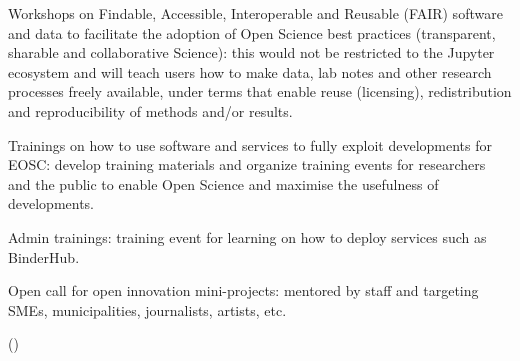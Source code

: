 \begin{task}[
  title=Training Workshops and community building,
  id=workshops,
  lead=UIO,
  PM=35, %
  wphases={0-48},
  partners={SRL,XFEL,QS,CDS,WTT,SIL,UPSUD,EP,INSERM}
]
\begin{compactitem}
   \item Workshops on Findable, Accessible, Interoperable and Reusable (FAIR) software and data to facilitate the adoption of Open Science best practices (transparent, sharable and collaborative Science): this would not be restricted to the Jupyter ecosystem and will teach users how to make data, lab notes and other research processes freely available, under terms that enable reuse (licensing), redistribution and reproducibility of methods and/or results.

   \item Trainings on how to use \TheProject software and services to fully exploit \TheProject developments for EOSC: develop training materials and organize training events for researchers and the public to enable Open Science and maximise the usefulness of \TheProject developments.

   \item \TheProject Admin trainings: training event for learning on how to deploy \TheProject services such as BinderHub.


   \item Open call for open innovation mini-projects: mentored by \TheProject staff and targeting SMEs, municipalities, journalists, artists, etc.

  \end{compactitem}
 
    ()
\end{task}
